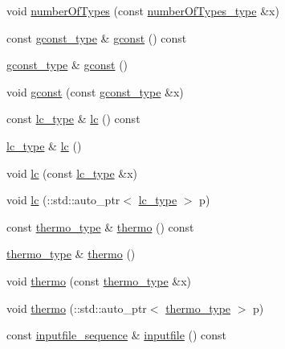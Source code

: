 \begin{DoxyCompactItemize}
\item 
void \hyperlink{classpse__t_afc33f5fb9ec3a56d45965b492f1c2c74}{number\-Of\-Types} (const \hyperlink{classpse__t_a3aa6a8cc1b9642304371fb935f6e1965}{number\-Of\-Types\-\_\-type} \&x)
\item 
const \hyperlink{classpse__t_a86b52d56dfb0c43a023d8bda8b4a19ed}{gconst\-\_\-type} \& \hyperlink{classpse__t_a56275a79bb5be350e896bdb8f96e9d0f}{gconst} () const 
\item 
\hyperlink{classpse__t_a86b52d56dfb0c43a023d8bda8b4a19ed}{gconst\-\_\-type} \& \hyperlink{classpse__t_a015cbd6cae33a2cbac8dfe6de45fc21b}{gconst} ()
\item 
void \hyperlink{classpse__t_af993fd9228e70d7fd21d5e29f296c6d9}{gconst} (const \hyperlink{classpse__t_a86b52d56dfb0c43a023d8bda8b4a19ed}{gconst\-\_\-type} \&x)
\item 
const \hyperlink{classpse__t_aa6a9bda12a405c1b9fb0baecbed9a1bb}{lc\-\_\-type} \& \hyperlink{classpse__t_a655f53f51144ada990e701b11a774553}{lc} () const 
\item 
\hyperlink{classpse__t_aa6a9bda12a405c1b9fb0baecbed9a1bb}{lc\-\_\-type} \& \hyperlink{classpse__t_afe44e5cd915052e6f62606e3401715e8}{lc} ()
\item 
void \hyperlink{classpse__t_ab0cd9346111c00b628bf7c204f7b76f8}{lc} (const \hyperlink{classpse__t_aa6a9bda12a405c1b9fb0baecbed9a1bb}{lc\-\_\-type} \&x)
\item 
void \hyperlink{classpse__t_a2745fd4372fa60a11ac7e2a28ef9da58}{lc} (\-::std\-::auto\-\_\-ptr$<$ \hyperlink{classpse__t_aa6a9bda12a405c1b9fb0baecbed9a1bb}{lc\-\_\-type} $>$ p)
\item 
const \hyperlink{classpse__t_aebaae32f697fb451e7bab83078867d4e}{thermo\-\_\-type} \& \hyperlink{classpse__t_abb2d165dc54a3477fc981c259b62ace8}{thermo} () const 
\item 
\hyperlink{classpse__t_aebaae32f697fb451e7bab83078867d4e}{thermo\-\_\-type} \& \hyperlink{classpse__t_a2c201aa23372362451be0eed3399b4fc}{thermo} ()
\item 
void \hyperlink{classpse__t_a7c4f6a3d067fc6263d33c66306d5fb46}{thermo} (const \hyperlink{classpse__t_aebaae32f697fb451e7bab83078867d4e}{thermo\-\_\-type} \&x)
\item 
void \hyperlink{classpse__t_a223df3e0d39422c4bc43a573972373a4}{thermo} (\-::std\-::auto\-\_\-ptr$<$ \hyperlink{classpse__t_aebaae32f697fb451e7bab83078867d4e}{thermo\-\_\-type} $>$ p)
\item 
const \hyperlink{classpse__t_a4256607256aa600165964a3a6d7b4a00}{inputfile\-\_\-sequence} \& \hyperlink{classpse__t_aaedba73e5a7e32a7c8a09dcb53e888ac}{inputfile} () const 

\end{DoxyCompactItemize}
